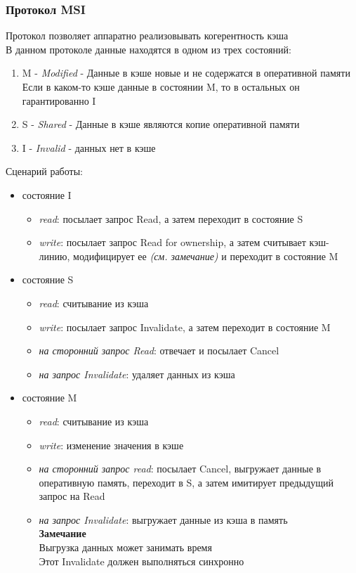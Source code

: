 \documentclass[12pt]{article}
\begin{document}
\subsubsection{Протокол MSI}
Протокол позволяет аппаратно реализовывать когерентность кэша\\
В данном протоколе данные находятся в одном из трех состояний:
\begin{enumerate}
    \item M - \textit{Modified} - Данные в кэше новые и не содержатся в оперативной памяти\\
    Если в каком-то кэше данные в состоянии M, то в остальных он гарантированно I
    \item S - \textit{Shared} - Данные в кэше являются копие оперативной памяти
    \item I - \textit{Invalid} - данных нет в кэше
\end{enumerate}
Сценарий работы:
\begin{itemize}
    \item состояние I
    \begin{itemize}
        \item \textit{read}: посылает запрос Read, а затем переходит в состояние S
        \item \textit{write}: посылает запрос Read for ownership, а затем считывает кэш-линию, модифицирует ее \textit{(см. замечание)} и переходит в состояние M\\
    \end{itemize}
    \item состояние S
    \begin{itemize}
        \item \textit{read}: считывание из кэша
        \item \textit{write}: посылает запрос Invalidate, а затем переходит в состояние M
        \item \textit{на сторонний запрос Read}: отвечает и посылает Cancel
        \item \textit{на запрос Invalidate}: удаляет данных из кэша
    \end{itemize}
    \item состояние M
    \begin{itemize}
        \item \textit{read}: считывание из кэша
        \item \textit{write}: изменение значения в кэше
        \item \textit{на сторонний запрос read}: посылает Cancel, выгружает данные в оперативную память, переходит в S, а затем имитирует предыдущий запрос на Read
        \item \textit{на запрос Invalidate}: выгружает данные из кэша в память\\
        \textbf{Замечание}\\
        Выгрузка данных может занимать время\\
        Этот Invalidate должен выполняться синхронно
    \end{itemize}
\end{itemize}
\end{document}
